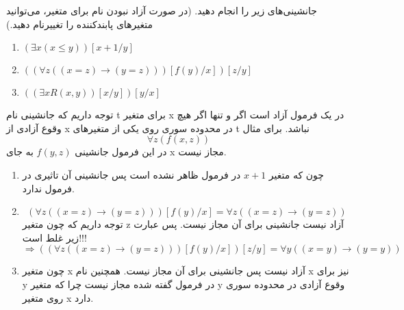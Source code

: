 
	جانشینی‌های زیر را انجام دهید. (در صورت آزاد نبودن نام برای متغیر، می‌توانید متغیرهای پابندکننده را تغییرنام دهید.)
	\begin{enumerate}[label=(\alph*)]
		\item $(\exists x (x \leq y))[x+1/y]$
		\item $((\forall z ((x = z) \rightarrow (y = z)))[f(y)/x])[z/y]$
		\item $((\exists x R(x, y))[x/y])[y/x]$
	\end{enumerate}
	\quad\vspace{0.5cm}
	\begin{ans}
		توجه داریم که جانشینی نام t برای متغیر x در یک فرمول آزاد است اگر و تنها اگر هیچ وقوع آزادی از x در محدوده سوری روی یکی از متغیر‌های t نباشد. 
		برای مثال
		$$
			\forall z(f(x, z))
		$$
		در این فرمول جانشینی 
		$
		 	f(y,z)
		$
		به جای x مجاز نیست.\\
		\begin{enumerate}[label=(\alph*)]
			\item چون که متغیر 
			$x + 1$
			 در فرمول ظاهر نشده است پس جانشینی آن تاثیری در فرمول ندارد.
			\item 
			$$
				(\forall z ((x = z) \rightarrow (y = z)))[f(y)/x] = \forall z ((x = z) \rightarrow (y = z))
			$$
			توجه داریم که چون متغیر z آزاد نیست جانشینی برای آن مجاز نیست. پس عبارت زیر غلط است!!!
			$$
				\Longrightarrow ((\forall z ((x = z) \rightarrow (y = z)))[f(y)/x])[z/y] = 
				\forall y ((x = y) \rightarrow (y = y))
			$$
			\item
			چون متغیر x آزاد نیست پس جانشینی برای آن مجاز نیست. همچنین نام x نیز برای y در فرمول گفته شده مجاز نیست چرا که متغیر y وقوع آزادی در محدوده سوری روی متغیر x دارد.
		\end{enumerate}
	\end{ans}
